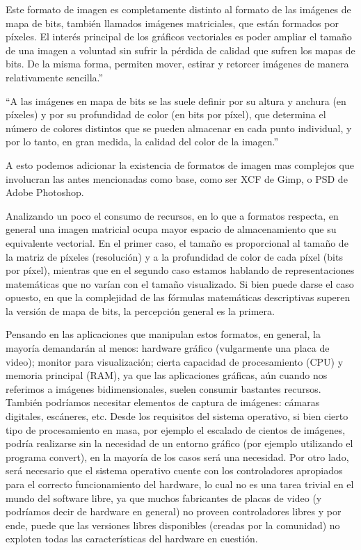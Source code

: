 \documentclass[12pt]{article}
\begin{document}
Este formato de imagen es completamente distinto al formato de las imágenes de mapa de bits, también 
llamados imágenes matriciales, que están formados por píxeles. El interés principal de los gráficos 
vectoriales es poder ampliar el tamaño de una imagen a voluntad sin sufrir la pérdida 
de calidad que sufren los mapas de bits. De la misma forma, permiten mover, estirar y 
retorcer imágenes de manera relativamente sencilla.'' \cite{wikiives}

``A las imágenes en mapa de bits se las suele definir por su altura y anchura (en píxeles) y por 
su profundidad de color (en bits por píxel), que determina el número de colores distintos que se 
pueden almacenar en cada punto individual, y por lo tanto, en gran medida, la calidad del color de la imagen.''
\cite{wikiimes}

A esto podemos adicionar la existencia de formatos de imagen mas complejos que involucran las antes mencionadas
como base, como ser XCF de Gimp, o PSD de Adobe Photoshop. 

Analizando un poco el consumo de recursos, en lo que a formatos respecta, en general una 
imagen matricial ocupa mayor espacio de almacenamiento que su equivalente vectorial. En el 
primer caso, el tamaño es proporcional al tamaño de la matriz de píxeles (resolución) y a la
profundidad de color de cada píxel (bits por píxel), mientras que en el segundo caso estamos 
hablando de representaciones matemáticas que no varían con el tamaño visualizado. Si bien puede 
darse el caso opuesto, en que la complejidad de las fórmulas matemáticas descriptivas superen 
la versión de mapa de bits, la percepción general es la primera. 

Pensando en las aplicaciones que manipulan estos formatos, en general, la mayoría demandarán al 
menos: hardware gráfico (vulgarmente una placa de video); 
monitor para visualización; cierta capacidad de procesamiento (CPU) y memoria principal (RAM), ya que 
las aplicaciones gráficas, aún cuando nos referimos a imágenes bidimensionales, suelen consumir bastantes 
recursos. También podríamos necesitar elementos de captura de imágenes: cámaras digitales, escáneres, etc.  
Desde los requisitos del sistema operativo, si bien cierto tipo de procesamiento en masa,
por ejemplo el escalado de cientos de imágenes, podría realizarse sin la necesidad de un
entorno gráfico (por ejemplo utilizando el programa convert), en la mayoría de los casos será una 
necesidad. Por otro lado, será necesario que el sistema operativo cuente con los controladores
apropiados para el correcto funcionamiento del hardware, lo cual no es una tarea trivial en 
el mundo del software libre, ya que muchos fabricantes de placas de video (y podríamos decir de hardware
en general) no proveen controladores libres y por ende, puede que las versiones libres 
disponibles (creadas por la comunidad) no exploten todas las características del hardware en cuestión.  
\end{document}
